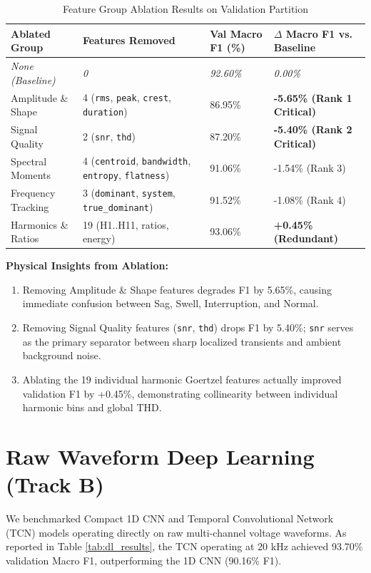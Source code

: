 \documentclass[12pt,a4paper]{report}
\begin{document}
\begin{table}[H]
\centering
\caption{Feature Group Ablation Results on Validation Partition}
\label{tab:ablation_results}
\begin{tabularx}{\textwidth}{lXXl}
\toprule
\textbf{Ablated Group} & \textbf{Features Removed} & \textbf{Val Macro F1 (\%)} & \textbf{$\Delta$ Macro F1 vs. Baseline} \\
\midrule
\textit{None (Baseline)} & \textit{0} & \textit{92.60\%} & \textit{0.00\%} \\
Amplitude \& Shape & 4 (\texttt{rms}, \texttt{peak}, \texttt{crest}, \texttt{duration}) & 86.95\% & \textbf{-5.65\% (Rank 1 Critical)} \\
Signal Quality & 2 (\texttt{snr}, \texttt{thd}) & 87.20\% & \textbf{-5.40\% (Rank 2 Critical)} \\
Spectral Moments & 4 (\texttt{centroid}, \texttt{bandwidth}, \texttt{entropy}, \texttt{flatness}) & 91.06\% & -1.54\% (Rank 3) \\
Frequency Tracking & 3 (\texttt{dominant}, \texttt{system}, \texttt{true\_dominant}) & 91.52\% & -1.08\% (Rank 4) \\
Harmonics \& Ratios & 19 (H1..H11, ratios, energy) & 93.06\% & \textbf{+0.45\% (Redundant)} \\
\bottomrule
\end{tabularx}
\end{table}

\noindent
\textbf{Physical Insights from Ablation:}
\begin{enumerate}
    \item Removing Amplitude \& Shape features degrades F1 by 5.65\%, causing immediate confusion between Sag, Swell, Interruption, and Normal.
    \item Removing Signal Quality features (\texttt{snr}, \texttt{thd}) drops F1 by 5.40\%; \texttt{snr} serves as the primary separator between sharp localized transients and ambient background noise.
    \item Ablating the 19 individual harmonic Goertzel features actually improved validation F1 by +0.45\%, demonstrating collinearity between individual harmonic bins and global THD.
\end{enumerate}

\section{Raw Waveform Deep Learning (Track B)}
We benchmarked Compact 1D CNN and Temporal Convolutional Network (TCN) models operating directly on raw multi-channel voltage waveforms. As reported in Table \ref{tab:dl_results}, the TCN operating at 20 kHz achieved 93.70\% validation Macro F1, outperforming the 1D CNN (90.16\% F1).
\end{document}
